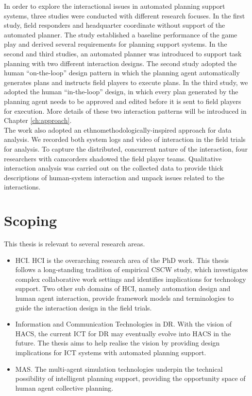In order to explore the interactional issues in automated planning support systems, three studies were conducted with different research focuses. In the first study, field responders and headquarter coordinate without support of the automated planner. The study established a baseline performance of the game play and derived several requirements for planning support systems. In the second and third studies, an automated planner was introduced to support task planning with two different interaction designs. The second study adopted the human ``on-the-loop'' design pattern in which the planning agent automatically generates plans and instructs field players to execute plans. In the third study, we adopted the human ``in-the-loop'' design, in which every plan generated by the planning agent needs to be approved and edited before it is sent to field players for execution. More details of these two interaction patterns will be introduced in Chapter \ref{ch:approach}.\\

The work also adopted an ethnomethodologically-inspired approach for data analysis. We recorded both system logs and video of interaction in the field trials for analysis. To capture the distributed, concurrent nature of the interaction, four researchers with camcorders shadowed the field player teams. Qualitative interaction analysis was carried out on the collected data to provide thick descriptions of human-system interaction and unpack issues related to the interactions.\\


\section{Scoping}\label{sec:custom}
This thesis is relevant to several research areas. \\

\begin{itemize} 
  \item \acf{HCI}. \ac{HCI} is the overarching research area of the PhD work. This thesis follows a long-standing tradition of empirical \ac{CSCW} study, which investigates complex  collaborative work settings and identifies implications for technology support. Two other sub domains of \ac{HCI}, namely automation design and human agent interaction, provide framework models and terminologies to guide the interaction design in the field trials.
  \item Information and Communication Technologies in \ac{DR}. With the vision of \ac{HACS}, the current \ac{ICT} for \ac{DR} may eventually evolve into \ac{HACS} in the future. The thesis aims to help realise the vision by providing design implications for \ac{ICT} systems with automated planning support. 
  \item \acf{MAS}. The multi-agent simulation technologies underpin the technical possibility of intelligent planning support, providing the opportunity space of human agent collective planning. 
\end{itemize}

